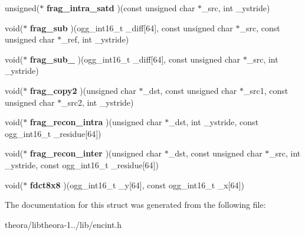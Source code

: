 \begin{DoxyCompactItemize}
\item 
\hypertarget{structoc__enc__opt__vtable_a7414c8f3575092dcf24e47135255c997}{unsigned($\ast$ {\bfseries frag\+\_\+intra\+\_\+satd} )(const unsigned char $\ast$\+\_\+src, int \+\_\+ystride)}\label{structoc__enc__opt__vtable_a7414c8f3575092dcf24e47135255c997}

\item 
\hypertarget{structoc__enc__opt__vtable_ab8d57324419b92ff02f13bfaa3af7eee}{void($\ast$ {\bfseries frag\+\_\+sub} )(ogg\+\_\+int16\+\_\+t \+\_\+diff\mbox{[}64\mbox{]}, const unsigned char $\ast$\+\_\+src, const unsigned char $\ast$\+\_\+ref, int \+\_\+ystride)}\label{structoc__enc__opt__vtable_ab8d57324419b92ff02f13bfaa3af7eee}

\item 
\hypertarget{structoc__enc__opt__vtable_a7f9b77ebdc73c82dfb37bdedf75c4df8}{void($\ast$ {\bfseries frag\+\_\+sub\+\_} )(ogg\+\_\+int16\+\_\+t \+\_\+diff\mbox{[}64\mbox{]}, const unsigned char $\ast$\+\_\+src, int \+\_\+ystride)}\label{structoc__enc__opt__vtable_a7f9b77ebdc73c82dfb37bdedf75c4df8}

\item 
\hypertarget{structoc__enc__opt__vtable_a97ff7153f66ec24c73b48435563c4ed8}{void($\ast$ {\bfseries frag\+\_\+copy2} )(unsigned char $\ast$\+\_\+dst, const unsigned char $\ast$\+\_\+src1, const unsigned char $\ast$\+\_\+src2, int \+\_\+ystride)}\label{structoc__enc__opt__vtable_a97ff7153f66ec24c73b48435563c4ed8}

\item 
\hypertarget{structoc__enc__opt__vtable_ac9745388f5b72272bc4e6abda45f547c}{void($\ast$ {\bfseries frag\+\_\+recon\+\_\+intra} )(unsigned char $\ast$\+\_\+dst, int \+\_\+ystride, const ogg\+\_\+int16\+\_\+t \+\_\+residue\mbox{[}64\mbox{]})}\label{structoc__enc__opt__vtable_ac9745388f5b72272bc4e6abda45f547c}

\item 
\hypertarget{structoc__enc__opt__vtable_afaf4bd7500f3bf7fa5b06a2a93fd9d6d}{void($\ast$ {\bfseries frag\+\_\+recon\+\_\+inter} )(unsigned char $\ast$\+\_\+dst, const unsigned char $\ast$\+\_\+src, int \+\_\+ystride, const ogg\+\_\+int16\+\_\+t \+\_\+residue\mbox{[}64\mbox{]})}\label{structoc__enc__opt__vtable_afaf4bd7500f3bf7fa5b06a2a93fd9d6d}

\item 
\hypertarget{structoc__enc__opt__vtable_ab687baadeeeae3d0f6f2f01557a12ad7}{void($\ast$ {\bfseries fdct8x8} )(ogg\+\_\+int16\+\_\+t \+\_\+y\mbox{[}64\mbox{]}, const ogg\+\_\+int16\+\_\+t \+\_\+x\mbox{[}64\mbox{]})}\label{structoc__enc__opt__vtable_ab687baadeeeae3d0f6f2f01557a12ad7}

\end{DoxyCompactItemize}


The documentation for this struct was generated from the following file\+:\begin{DoxyCompactItemize}
\item 
theora/libtheora-\/1../lib/encint.\+h\end{DoxyCompactItemize}
